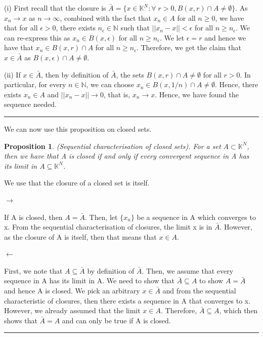 \documentclass[twoside]{article}
\newtheorem{proposition}[theorem]{Proposition}
\newenvironment{proof}{{\bf Proof:}}{\hfill\rule{2mm}{2mm}}
\begin{document}
\begin{proof}
(i) First recall that the closure is $\bar{A} = \{x \in \mathbb{K}^N: \forall \; r > 0, B(x,r) \cap A \neq \emptyset \}$. As $x_n \rightarrow x$ as $n \rightarrow \infty$, combined with the fact that $x_n \in A$ for all $n \geq 0$, we have that for all $\epsilon > 0$, there exists $n_{\epsilon} \in \mathbb{N}$ such that $||x_n - x|| < \epsilon$ for all $n \geq n_{\epsilon}$. We can re-express this as $x_n \in B(x,\epsilon)$ for all $n \geq n_{\epsilon}$. We let $\epsilon = r$ and hence we have that $x_n \in B(x,r) \cap A$ for all $n \geq n_{\epsilon}$. Therefore, we get the claim that $x \in \bar{A}$ as $B(x,\epsilon) \cap A \neq \emptyset$.

(ii) If $x \in \bar{A}$, then by definition of $\bar{A}$, the sets $B(x,r) \cap A \neq \emptyset$ for all $r > 0$. In particular, for every $n \in \mathbb{N}$, we can choose $x_n \in B(x, 1/n) \cap A \neq \emptyset$. Hence, there exists $x_n \in A$ and $||x_n - x|| \rightarrow 0$, that is, $x_n \rightarrow x$. Hence, we have found the sequence needed.

\end{proof}

We can now use this proposition on closed sets.
\begin{proposition}(Sequential characterisation of closed sets). For a set $A \subset \mathbb{K}^N$, then we have that A is closed if and only if every convergent sequence in A has its limit in $A \subseteq \mathbb{K}^N$.
\end{proposition}

\begin{proof}
We use that the closure of a closed set is itself.

$\rightarrow$

If A is closed, then $A = \bar{A}$. Then, let $\{x_n\}$ be a sequence in A which converges to x. From the sequential characterisation of closures, the limit x is in $\bar{A}$. However, as the closure of A is itself, then that means that $x \in A$.

$\leftarrow$

First, we note that $A \subseteq \bar{A}$ by definition of $\bar{A}$. Then, we assume that every sequence in A has its limit in A. We need to show that $\bar{A} \subseteq A$ to show $A = \bar{A}$ and hence A is closed. We pick an arbitrary $x \in \bar{A}$ and from the sequential characteristic of closures, then there exists a sequence in A that converges to x. However, we already assumed that the limit $x \in A$. Therefore, $\bar{A} \subseteq A$, which then shows that $\bar{A} = A$ and can only be true if A is closed.
\end{proof}
\end{document}
